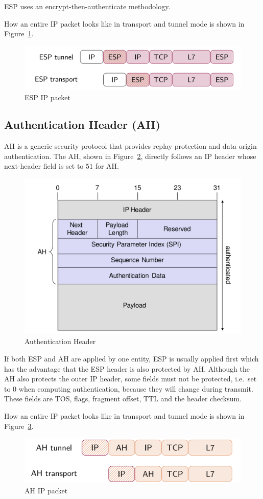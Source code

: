 ESP uses an encrypt-then-authenticate methodology.

How an entire IP packet looks like in transport and tunnel mode is shown in Figure~\ref{fig:esp_ip_packet}.
\begin{figure}[h]
  \centering
  \includegraphics[width=.9\textwidth]{figures/esp_ip_packet}
  \caption{ESP IP packet}\label{fig:esp_ip_packet}
\end{figure}

\subsection{Authentication Header (AH)}
AH is a generic security protocol that provides replay protection and data origin authentication.
The AH, shown in Figure~\ref{fig:ah_header}, directly follows an IP header whose next-header field is set to $51$ for AH\@.
\begin{figure}[h]
  \centering
  \includegraphics[width=.7\textwidth]{figures/ah_header.png}
  \caption{Authentication Header}\label{fig:ah_header}
\end{figure}
If both ESP and AH are applied by one entity, ESP is usually applied first which has the advantage that the ESP header is also protected by AH\@.
Although the AH also protects the outer IP header, some fields must not be protected, i.e.\ set to $0$ when computing authentication, because they will change during transmit.
These fields are TOS, flags, fragment offset, TTL and the header checksum.

How an entire IP packet looks like in transport and tunnel mode is shown in Figure~\ref{fig:ah_ip_packet}.
\begin{figure}[h]
  \centering
  \includegraphics[width=.8\textwidth]{figures/ah_ip_packet.png}
  \caption{AH IP packet}\label{fig:ah_ip_packet}
\end{figure}

